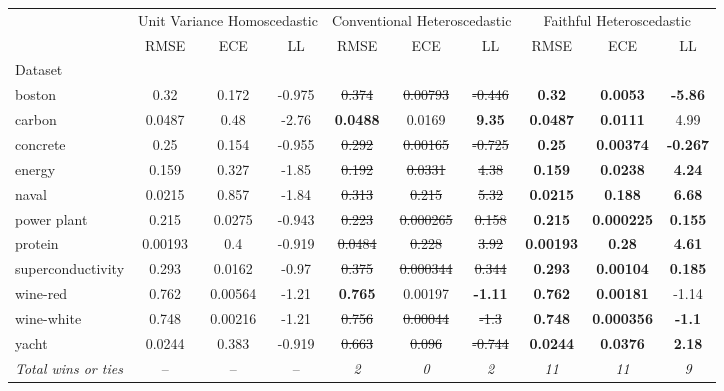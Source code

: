 \begin{tabular}{l|ccc|ccc|ccc}
\toprule
 & \multicolumn{3}{|c}{Unit Variance Homoscedastic} & \multicolumn{3}{|c}{Conventional Heteroscedastic} & \multicolumn{3}{|c}{Faithful Heteroscedastic} \\
 & RMSE & ECE & LL & RMSE & ECE & LL & RMSE & ECE & LL \\
Dataset &  &  &  &  &  &  &  &  &  \\
\midrule
boston & 0.32 & 0.172 & -0.975 & \sout{0.374} & \sout{0.00793} & \sout{-0.446} & \textbf{0.32} & \textbf{0.0053} & \textbf{-5.86} \\
carbon & 0.0487 & 0.48 & -2.76 & \textbf{0.0488} & 0.0169 & \textbf{9.35} & \textbf{0.0487} & \textbf{0.0111} & 4.99 \\
concrete & 0.25 & 0.154 & -0.955 & \sout{0.292} & \sout{0.00165} & \sout{-0.725} & \textbf{0.25} & \textbf{0.00374} & \textbf{-0.267} \\
energy & 0.159 & 0.327 & -1.85 & \sout{0.192} & \sout{0.0331} & \sout{4.38} & \textbf{0.159} & \textbf{0.0238} & \textbf{4.24} \\
naval & 0.0215 & 0.857 & -1.84 & \sout{0.313} & \sout{0.215} & \sout{5.32} & \textbf{0.0215} & \textbf{0.188} & \textbf{6.68} \\
power plant & 0.215 & 0.0275 & -0.943 & \sout{0.223} & \sout{0.000265} & \sout{0.158} & \textbf{0.215} & \textbf{0.000225} & \textbf{0.155} \\
protein & 0.00193 & 0.4 & -0.919 & \sout{0.0484} & \sout{0.228} & \sout{3.92} & \textbf{0.00193} & \textbf{0.28} & \textbf{4.61} \\
superconductivity & 0.293 & 0.0162 & -0.97 & \sout{0.375} & \sout{0.000344} & \sout{0.344} & \textbf{0.293} & \textbf{0.00104} & \textbf{0.185} \\
wine-red & 0.762 & 0.00564 & -1.21 & \textbf{0.765} & 0.00197 & \textbf{-1.11} & \textbf{0.762} & \textbf{0.00181} & -1.14 \\
wine-white & 0.748 & 0.00216 & -1.21 & \sout{0.756} & \sout{0.00044} & \sout{-1.3} & \textbf{0.748} & \textbf{0.000356} & \textbf{-1.1} \\
yacht & 0.0244 & 0.383 & -0.919 & \sout{0.663} & \sout{0.096} & \sout{-0.744} & \textbf{0.0244} & \textbf{0.0376} & \textbf{2.18} \\
\textit{{Total wins or ties}} & -- & -- & -- & \textit{2} & \textit{0} & \textit{2} & \textit{11} & \textit{11} & \textit{9} \\
\bottomrule
\end{tabular}
